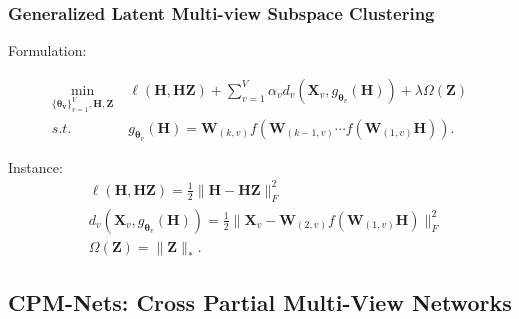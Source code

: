 \documentclass[notheorems, aspectratio=54]{beamer}
\begin{document}
\begin{frame} \frametitle{Generalized Latent Multi-view Subspace Clustering}

Formulation:

\begin{equation}
\begin{split}
  \min_{\{\boldsymbol{\theta_v}\}_{v=1}^V, \mathbf{H}, \mathbf{Z}}\; & \ell(\mathbf{H}, \mathbf{H}\mathbf{Z}) + \sum_{v=1}^V\alpha_vd_v(\mathbf{X}_v, g_{\boldsymbol{\theta}_v}(\mathbf{H})) + \lambda \Omega(\mathbf{Z}) \\
  s.t.\; & g_{\boldsymbol{\theta}_v}(\mathbf{H}) = \mathbf{W}_{(k,v)}f(\mathbf{W}_{(k-1,v)} \cdots f(\mathbf{W}_{(1,v)}\mathbf{H})).
\end{split}
\end{equation}

Instance:
\begin{equation}
\begin{split}
  & \ell(\mathbf{H}, \mathbf{H}\mathbf{Z}) = \frac{1}{2} \|\mathbf{H} - \mathbf{H}\mathbf{Z}\|_F^2 \\
  & d_v(\mathbf{X}_v, g_{\boldsymbol{\theta}_v}(\mathbf{H})) = \frac{1}{2} \|\mathbf{X}_v - \mathbf{W}_{(2,v)}f(\mathbf{W}_{(1,v)}\mathbf{H})\|_F^2 \\
  & \Omega(\mathbf{Z}) = \|\mathbf{Z}\|_*.
\end{split}
\end{equation}


\end{frame}


\subsection{CPM-Nets: Cross Partial Multi-View Networks}
\end{document}
